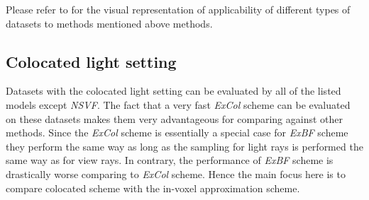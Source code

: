 Please refer to  for the visual representation of applicability of different types of datasets to methods mentioned above methods.






\subsection{Colocated light setting}
\label{subsec:experiments_coloc}

Datasets with the colocated light setting can be evaluated by all of the listed models except \textit{NSVF}.
The fact that a very fast \textit{ExCol} scheme can be evaluated on these datasets
makes them very advantageous for comparing against other methods.
Since the \textit{ExCol} scheme is essentially a special case for \textit{ExBF} scheme
they perform the same way as long as the sampling for light rays is performed the same way as for view rays.
In contrary, the performance of \textit{ExBF} scheme is drastically worse comparing to \textit{ExCol} scheme.
Hence the main focus here is to compare colocated scheme with the in-voxel approximation scheme.





